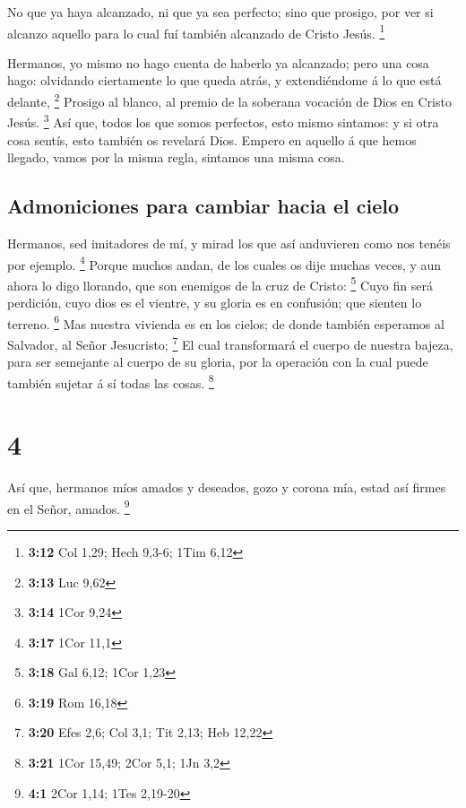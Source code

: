  No que ya haya alcanzado, ni que ya sea perfecto; sino que
prosigo, por ver si alcanzo aquello para lo cual fuí también alcanzado
de Cristo Jesús. \footnote{\textbf{3:12} Col 1,29; Hech 9,3-6; 1Tim 6,12}

 Hermanos, yo mismo no hago cuenta de haberlo ya alcanzado;
pero una cosa hago: olvidando ciertamente lo que queda atrás, y
extendiéndome á lo que está delante, \footnote{\textbf{3:13} Luc 9,62}
 Prosigo al blanco, al premio de la soberana vocación de
Dios en Cristo Jesús. \footnote{\textbf{3:14} 1Cor 9,24} 
Así que, todos los que somos perfectos, esto mismo sintamos: y si otra
cosa sentís, esto también os revelará Dios.  Empero en
aquello á que hemos llegado, vamos por la misma regla, sintamos una
misma cosa.

\hypertarget{admoniciones-para-cambiar-hacia-el-cielo}{%
\subsection{Admoniciones para cambiar hacia el
cielo}\label{admoniciones-para-cambiar-hacia-el-cielo}}

 Hermanos, sed imitadores de mí, y mirad los que así
anduvieren como nos tenéis por ejemplo. \footnote{\textbf{3:17} 1Cor
  11,1}  Porque muchos andan, de los cuales os dije muchas
veces, y aun ahora lo digo llorando, que son enemigos de la cruz de
Cristo: \footnote{\textbf{3:18} Gal 6,12; 1Cor 1,23}  Cuyo
fin será perdición, cuyo dios es el vientre, y su gloria es en
confusión; que sienten lo terreno. \footnote{\textbf{3:19} Rom 16,18}
 Mas nuestra vivienda es en los cielos; de donde también
esperamos al Salvador, al Señor Jesucristo; \footnote{\textbf{3:20} Efes
  2,6; Col 3,1; Tit 2,13; Heb 12,22}  El cual transformará
el cuerpo de nuestra bajeza, para ser semejante al cuerpo de su gloria,
por la operación con la cual puede también sujetar á sí todas las cosas.
\footnote{\textbf{3:21} 1Cor 15,49; 2Cor 5,1; 1Jn 3,2}

\hypertarget{section-3}{%
\section{4}\label{section-3}}

 Así que, hermanos míos amados y deseados, gozo y corona
mía, estad así firmes en el Señor, amados. \footnote{\textbf{4:1} 2Cor
  1,14; 1Tes 2,19-20}

